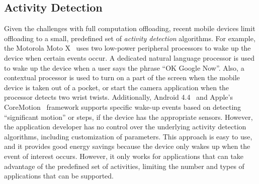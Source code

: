 \subsection{Activity Detection}

Given the challenges with full computation offloading, recent mobile
devices limit offloading to a small, predefined set of \emph{activity
detection} algorithms.  For example, the Motorola Moto X~\cite{motox}
uses two low-power peripheral processors to wake up the device when
certain events occur.  A dedicated natural language processor is used
to wake up the device when a user says the phrase ``OK Google Now''.  Also, 
a contextual processor is used to turn on a part of the screen
when the mobile device is taken out of a pocket, or start the camera
application when the processor detects two wrist twists.  Additionally, 
Android 4.4~\cite{android4.4} and Apple's CoreMotion~\cite{coreMotion} framework supports specific wake-up
events based on detecting ``significant motion'' or steps, if the device
has the appropriate sensors.  However, the application developer has no
control over the underlying activity detection algorithms, including
customization of parameters.  This approach is easy to use, and it
provides good energy savings because the device only wakes up when the
event of interest occurs.  However, it only works for applications that
can take advantage of the predefined set of activities, limiting the
number and types of applications that can be supported.


